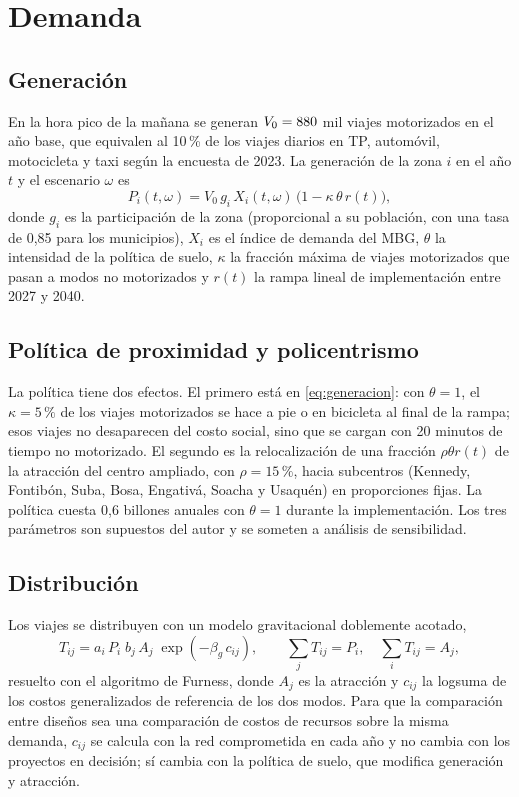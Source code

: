 \section{Demanda}

\subsection{Generación}

En la hora pico de la mañana se generan $V_0=880$ mil viajes motorizados en el año base,
que equivalen al 10\,\% de los viajes diarios en TP, automóvil, motocicleta y taxi según la encuesta de
2023. La generación de la zona $i$ en el año $t$ y el escenario $\omega$ es
\begin{equation}\label{eq:generacion}
P_i(t,\omega)=V_0\,g_i\,X_i(t,\omega)\,\big(1-\kappa\,\theta\,r(t)\big),
\end{equation}
donde $g_i$ es la participación de la zona (proporcional a su población, con una tasa de 0,85 para los
municipios), $X_i$ es el índice de demanda del MBG, $\theta$ la intensidad de la política de suelo,
$\kappa$ la fracción máxima de viajes motorizados que pasan a modos no motorizados y $r(t)$ la rampa
lineal de implementación entre 2027 y 2040.

\subsection{Política de proximidad y policentrismo}\label{sec:suelo}

La política tiene dos efectos. El primero está en \eqref{eq:generacion}: con $\theta=1$, el
$\kappa=5\,\%$ de los viajes motorizados se hace a pie o en bicicleta al final de la rampa; esos viajes
no desaparecen del costo social, sino que se cargan con 20 minutos de tiempo no motorizado. El segundo
es la relocalización de una fracción $\rho\theta r(t)$ de la atracción del centro ampliado, con
$\rho=15\,\%$, hacia subcentros (Kennedy, Fontibón, Suba, Bosa, Engativá, Soacha y Usaquén) en
proporciones fijas. La política cuesta 0,6 billones anuales con $\theta=1$ durante la implementación.
Los tres parámetros son supuestos del autor y se someten a análisis de sensibilidad.

\subsection{Distribución}

Los viajes se distribuyen con un modelo gravitacional doblemente acotado,
\begin{equation}\label{eq:gravedad}
T_{ij}=a_i\,P_i\;b_j\,A_j\;\exp(-\beta_g\,c_{ij}),\qquad \sum_jT_{ij}=P_i,\quad\sum_iT_{ij}=A_j,
\end{equation}
resuelto con el algoritmo de Furness, donde $A_j$ es la atracción y $c_{ij}$ la logsuma de los costos
generalizados de referencia de los dos modos. Para que la comparación entre diseños sea una comparación
de costos de recursos sobre la misma demanda, $c_{ij}$ se calcula con la red comprometida en cada año y
no cambia con los proyectos en decisión; sí cambia con la política de suelo, que modifica generación y
atracción.

